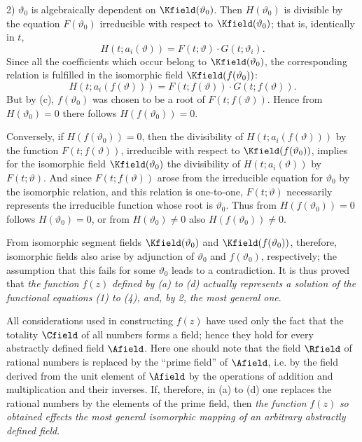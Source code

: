 \documentclass[11pt]{article}
\begin{document}
2) \(\vartheta_0\) is algebraically dependent on \(\Kfield(\vartheta_0)\). Then \(H(\vartheta_0)\) is divisible by the equation \(F(\vartheta_0)\) irreducible with respect to \(\Kfield(\vartheta_0)\); that is, identically in \(t\),
\[
H(t;a_i(\vartheta))=F(t;\vartheta)\cdot G(t;\vartheta_i).
\]
Since all the coefficients which occur belong to \(\Kfield(\vartheta_0)\), the corresponding relation is fulfilled in the isomorphic field \(\Kfield(f(\vartheta_0))\):
\[
H(t;a_i(f(\vartheta)))=F(t;f(\vartheta))\cdot G(t;f(\vartheta)).
\]
But by (c), \(f(\vartheta_0)\) was chosen to be a root of \(F(t;f(\vartheta))\). Hence from \(H(\vartheta_0)=0\) there follows \(H(f(\vartheta_0))=0\).

Conversely, if \(H(f(\vartheta_0))=0\), then the divisibility of \(H(t;a_i(f(\vartheta)))\) by the function \(F(t;f(\vartheta))\), irreducible with respect to \(\Kfield(f(\vartheta_0))\), implies for the isomorphic field \(\Kfield(\vartheta_0)\) the divisibility of \(H(t;a_i(\vartheta))\) by \(F(t;\vartheta)\). And since \(F(t;f(\vartheta))\) arose from the irreducible equation for \(\vartheta_0\) by the isomorphic relation, and this relation is one-to-one, \(F(t;\vartheta)\) necessarily represents the irreducible function whose root is \(\vartheta_0\). Thus from \(H(f(\vartheta_0))=0\) follows \(H(\vartheta_0)=0\), or from \(H(\vartheta_0)\ne0\) also \(H(f(\vartheta_0))\ne0\).

From isomorphic segment fields \(\Kfield(\vartheta_0)\) and \(\Kfield(f(\vartheta_0))\), therefore, isomorphic fields also arise by adjunction of \(\vartheta_0\) and \(f(\vartheta_0)\), respectively; the assumption that this fails for some \(\vartheta_0\) leads to a contradiction. It is thus proved that \emph{the function} \(f(z)\) \emph{defined by (a) to (d) actually represents a solution of the functional equations (1) to (4), and, by 2, the most general one}.

All considerations used in constructing \(f(z)\) have used only the fact that the totality \(\Cfield\) of all numbers forms a field; hence they hold for every abstractly defined field \(\Afield\). Here one should note that the field \(\Rfield\) of rational numbers is replaced by the ``prime field'' of \(\Afield\), i.e. by the field derived from the unit element of \(\Afield\) by the operations of addition and multiplication and their inverses. If, therefore, in (a) to (d) one replaces the rational numbers by the elements of the prime field, then \emph{the function} \(f(z)\) \emph{so obtained effects the most general isomorphic mapping of an arbitrary abstractly defined field}.
\end{document}
